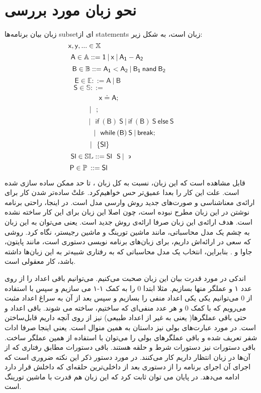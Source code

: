\section{نحو زبان مورد بررسی‬}
زبان بیان برنامه‌ها \gls*{subset}ای از \glspl*{statement} زبان  است، به شکل زیر:
$$\mathsf{x,y},... \in \mathbb{X}\hspace{4.65cm}$$
$$\mathsf{A} \in \mathbb{A} ::=\mathsf{1\:|\:x\:|\:A_1 - A_2\hspace{2.4cm}}$$  
$$\mathsf{B \in \mathbb{B} ::=A_1<A_2 \:|\: B_1 \: nand\: B_2\hspace{1.2cm}}$$
$$\mathsf{E \in \mathbb{E}::= A \: | \: B\hspace{4cm}}$$
$$\mathsf{S\in \mathbb{S} ::=\hspace{5cm}  }$$
$$\mathsf{x\doteq A; \hspace{2.25cm}}$$
$$\mathsf{|\:\:\:;\hspace{3.75cm}}$$
$$\mathsf{|\:\:\:if\:(B)\:S\:|\:if\:(B)\:S\:else\:S}$$
$$\mathsf{|\:\:\:while\:(B)\:S\: | \: break;\hspace{0.65cm}}$$
$$\mathsf{|\:\:\:\{Sl\}\hspace{3.15cm}}$$
$$\mathsf{Sl \in \mathbb{SL}::=Sl\:\:\:S\:|\:\backepsilon}\hspace{3.05cm}$$
$$\mathsf{P\in \mathbb{P}\:::=Sl}\hspace{4.25cm}$$

\vspace{1cm}
قابل مشاهده است که این زبان، نسبت به کل زبان ، تا حد ممکن ساده سازی شده است. علت این کار را بعدا عمیق‌تر حس خواهیم‌کرد. علتْ ساده‌تر شدن کار برای ارائه‌ی معناشناسی و صورت‌های جدید روش وارسی مدل است. در اینجا، راحتی برنامه نوشتن در این زبان مطرح نبوده است، چون اصلا این زبان برای این کار ساخته نشده است. هدف ارائه‌ی این زبان صرفا ارائه‌ی روش جدید است. یعنی می‌توان به این زبان به چشم یک مدل محاسباتی، مانند ماشین تورینگ و ماشین رجیستر، نگاه کرد. روشی که سعی در ارائه‌اش داریم، برای زبان‌های برنامه نویسی دستوری است، مانند پایتون، جاوا و . بنابراین، انتخاب یک مدل محاسباتی که به رفتاری شبیه‌تر به این زبان‌ها داشته باشد، کار معقولی است.

اندکی در مورد قدرت بیان این زبان صحبت می‌کنیم. می‌توانیم باقی اعداد را از روی عدد ۱ و عملگر منها بسازیم. مثلا ابتدا 0 را به کمک ۱-۱ می سازیم و سپس با استفاده از 0 می‌توانیم یکی یکی اعداد منفی را بسازیم و سپس بعد از آن به سراغ اعداد مثبت می‌رویم که با کمک 0 و هر عدد منفی‌ای که ساختیم، ساخته می شوند. باقی اعداد و حتی باقی عملگر‌ها( یعنی به غیر از اعداد طبیعی) نیز از روی آنچه داریم قابل‌ساختن است. در مورد عبارت‌های بولی نیز داستان به همین منوال است. یعنی اینجا صرفا ادات شفر تعریف شده و باقی عملگر‌های بولی را می‌توان با استفاده از همین عملگر ساخت. باقی دستورات نیز دستورات شرط و حلقه هستند. باقی دستورات مطابق رفتاری که از آن‌ها در زبان  انتظار داریم کار می‌کنند. در مورد دستور  ذکر این نکته ضروری است که اجرای آن اجرای برنامه را از دستوری بعد از داخلی‌ترین حلقه‌ای که  داخلش قرار دارد ادامه می‌‌دهد. در پایان می توان ثابت کرد که این زبان هم قدرت با ماشین تورینگ\cite{davis} است. 


